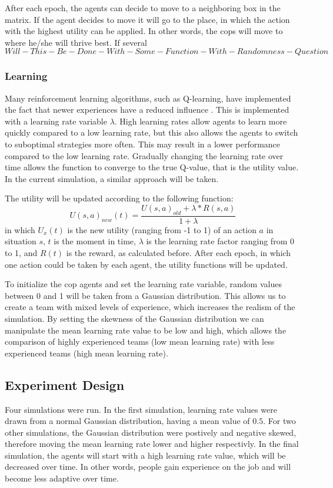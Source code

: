 After each epoch, the agents can decide to move to a neighboring box in the matrix. If the agent decides to move it will go to the place, in which the action with the highest utility can be applied. In other words, the cops will move to where he/she will thrive best. If several 
$$ Will-This-Be-Done-With-Some-Function-With-Randomness-Question$$

\subsubsection{Learning}
Many reinforcement learning algorithms, such as Q-learning, have implemented the fact that newer experiences have a reduced influence  \citep*{watkins1992q}. This is implemented with a learning rate variable $\lambda$. High learning rates allow agents to learn more quickly compared to a low learning rate, but this also allows the agents to switch to suboptimal strategies more often. This may result in a lower performance compared to the low learning rate. Gradually changing the learning rate over time allows the function to converge to the true Q-value, that is the utility value. In the current simulation, a similar approach will be taken. 

The utility will be updated according to the following function:
$$ U(s,a)_{new}(t) = \frac{U(s,a)_{old} + \lambda * R(s,a)}{1+\lambda} $$
in which $U_x(t)$ is the new utility (ranging from -1 to 1) of an action $a$ in situation $s$, $t$ is the moment in time, $\lambda$ is the learning rate factor ranging from 0 to 1, and $R(t)$ is the reward, as calculated before. After each epoch, in which one action could be taken by each agent, the utility functions will be updated. 

To initialize the cop agents and set the learning rate variable, random values between 0 and 1 will be taken from a Gaussian distribution. This allows us to create a team with mixed levels of experience, which increases the realism of the simulation. By setting the skewness of the Gaussian distribution we can manipulate the mean learning rate value to be low and high, which allows the comparison of highly experienced teams (low mean learning rate) with less experienced teams (high mean learning rate). 

\subsection{Experiment Design}
Four simulations were run. In the first simulation, learning rate values were drawn from a normal Gaussian distribution, having a mean value of $0.5$. For two other simulations, the Gaussian distribution were postively and negative skewed, therefore moving the mean learning rate lower and higher respectivly. In the final simulation, the agents will start with a high learning rate value, which will be decreased over time. In other words, people gain experience on the job and will become less adaptive over time. 

